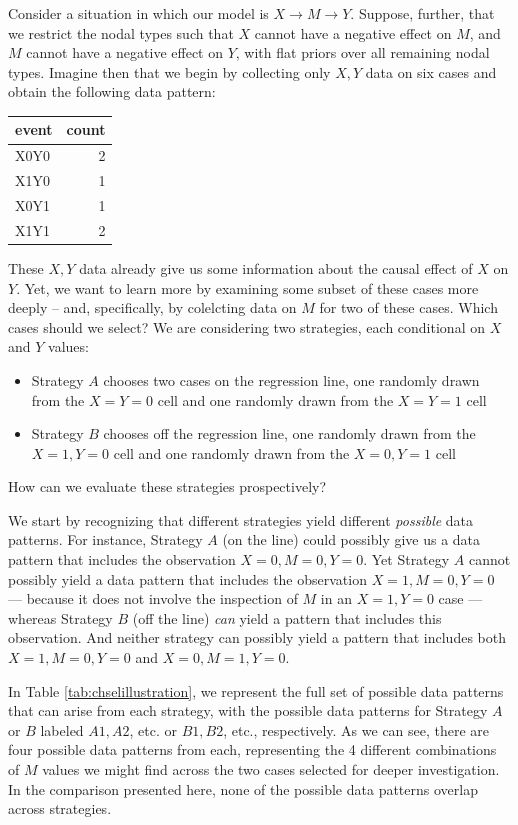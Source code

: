 \documentclass[
  12pt,
]{book}
\providecommand{\tightlist}{%
  \setlength{\itemsep}{0pt}\setlength{\parskip}{0pt}}
\begin{document}
Consider a situation in which our model is \(X \rightarrow M \rightarrow Y\). Suppose, further, that we restrict the nodal types such that \(X\) cannot have a negative effect on \(M\), and \(M\) cannot have a negative effect on \(Y\), with flat priors over all remaining nodal types. Imagine then that we begin by collecting only \(X,Y\) data on six cases and obtain the following data pattern:

\begin{tabular}{l|r}
\hline
event & count\\
\hline
X0Y0 & 2\\
\hline
X1Y0 & 1\\
\hline
X0Y1 & 1\\
\hline
X1Y1 & 2\\
\hline
\end{tabular}

These \(X,Y\) data already give us some information about the causal effect of \(X\) on \(Y\). Yet, we want to learn more by examining some subset of these cases more deeply -- and, specifically, by colelcting data on \(M\) for two of these cases. Which cases should we select? We are considering two strategies, each conditional on \(X\) and \(Y\) values:

\begin{itemize}
\tightlist
\item
  Strategy \(A\) chooses two cases on the regression line, one randomly drawn from the \(X=Y=0\) cell and one randomly drawn from the \(X=Y=1\) cell
\item
  Strategy \(B\) chooses off the regression line, one randomly drawn from the \(X=1, Y=0\) cell and one randomly drawn from the \(X=0, Y=1\) cell
\end{itemize}

How can we evaluate these strategies prospectively?

We start by recognizing that different strategies yield different \emph{possible} data patterns. For instance, Strategy \(A\) (on the line) could possibly give us a data pattern that includes the observation \(X=0, M=0, Y=0\). Yet Strategy \(A\) cannot possibly yield a data pattern that includes the observation \(X=1, M=0, Y=0\) --- because it does not involve the inspection of \(M\) in an \(X=1, Y=0\) case --- whereas Strategy \(B\) (off the line) \emph{can} yield a pattern that includes this observation. And neither strategy can possibly yield a pattern that includes both \(X=1, M=0, Y=0\) and \(X=0, M=1, Y=0\).

In Table \ref{tab:chselillustration}, we represent the full set of possible data patterns that can arise from each strategy, with the possible data patterns for Strategy \(A\) or \(B\) labeled \(A1, A2\), etc. or \(B1, B2\), etc., respectively. As we can see, there are four possible data patterns from each, representing the 4 different combinations of \(M\) values we might find across the two cases selected for deeper investigation. In the comparison presented here, none of the possible data patterns overlap across strategies.
\end{document}
